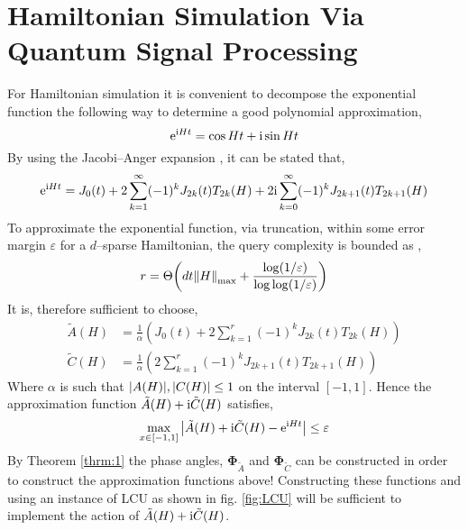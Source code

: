 \documentclass{article}
\begin{document}
\clearpage
\section{Hamiltonian Simulation Via Quantum Signal Processing}
For Hamiltonian simulation it is convenient to decompose the exponential function the following way to determine a good polynomial approximation,
\begin{equation}
    \mathrm{e}^{\mathrm{i} H t} = \cos Ht + \mathrm{i} \sin Ht
\end{equation}
By using the Jacobi--Anger expansion \cite{LC17,CMNRS18}, it can be stated that,
\begin{equation}
    \mathrm{e}^{\mathrm{i} H t} = J_0(t)+ 2\sum_{k=1}^\infty (-1)^k J_{2k}(t)T_{2k}(H) + 2\mathrm{i}\sum_{k=0}^\infty (-1)^k J_{2k+1}(t)T_{2k+1}(H)
\end{equation}
To approximate the exponential function, via truncation, within some error margin $\varepsilon$ for a $d$--sparse Hamiltonian, the query complexity is bounded as \cite{LC17},
\begin{equation}
    r = \Theta\bigg(dt\norm{H}_{\text{max}} + \frac{\log(1/\varepsilon)}{\log\log(1/\varepsilon)} \bigg)
\end{equation}
It is, therefore sufficient to choose,
\begin{align}
    \tilde{A}(H) &= \frac{1}{\alpha}\left(J_0(t)+ 2\sum_{k=1}^r (-1)^k J_{2k}(t)T_{2k}(H) \right)\\
    \tilde{C}(H) &= \frac{1}{\alpha}\left(2\sum_{k=1}^r (-1)^k J_{2k+1}(t)T_{2k+1}(H) \right)
\end{align}
Where $\alpha$ is such that $\abs{A(H)}, \abs{C(H)} \leq 1$ on the interval $[-1,1]$. Hence the approximation function $\tilde{A}(H) + \mathrm{i}\tilde{C}(H)$ satisfies,
\begin{equation}
    \max_{x\in[-1,1]}\abs{\tilde{A}(H) + \mathrm{i}\tilde{C}(H) - \mathrm{e}^{\mathrm{i} H t}}\leq \varepsilon
\end{equation}
By Theorem \ref{thrm:1} the phase angles, $\boldsymbol{\Phi}_{\tilde{A}}$ and $\boldsymbol{\Phi}_{\tilde{C}}$ can be constructed in order to construct the approximation functions above! Constructing these functions and using an instance of \textsc{LCU} as shown in fig. \ref{fig:LCU} will be sufficient to implement the action of $\tilde{A}(H) + \mathrm{i}\tilde{C}(H)$.

\clearpage
\end{document}
